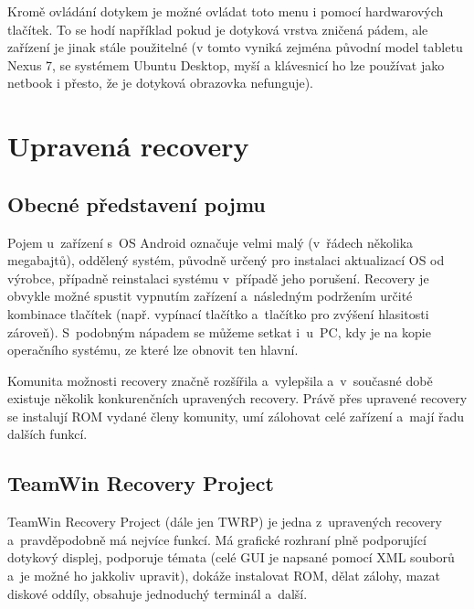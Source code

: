 \documentclass[12pt, a4paper, oneside]{article}
\begin{document}
Kromě ovládání dotykem je možné ovládat toto menu i pomocí hardwarových tlačítek. To se hodí například pokud je dotyková vrstva zničená pádem, ale zařízení je jinak stále použitelné (v tomto vyniká zejména původní model tabletu Nexus 7, se systémem Ubuntu Desktop, myší a klávesnicí ho lze používat jako netbook i přesto, že je dotyková obrazovka nefunguje).

\newpage
\section{Upravená recovery}
\label{recovery}
\subsection{Obecné představení pojmu}
Pojem  u~zařízení s~OS Android označuje velmi malý (v~řádech několika megabajtů), oddělený systém, původně určený pro instalaci aktualizací OS od výrobce, případně reinstalaci systému v~případě jeho porušení. Recovery je obvykle možné spustit vypnutím zařízení a~následným podržením určité kombinace tlačítek (např. vypínací tlačítko a~tlačítko pro zvýšení hlasitosti zároveň). S~podobným nápadem se můžeme setkat i~u~PC, kdy je na  kopie operačního systému, ze které lze obnovit ten hlavní.

Komunita možnosti recovery značně rozšířila a~vylepšila a~v~současné době existuje několik konkurenčních upravených recovery. Právě přes upravené recovery se instalují ROM vydané členy komunity, umí zálohovat celé zařízení a~mají řadu dalších funkcí.

\newpage
\subsection{TeamWin Recovery Project}
TeamWin Recovery Project\cite{twrp} (dále jen TWRP) je jedna z~upravených recovery a~pravděpodobně má nejvíce funkcí. Má grafické rozhraní plně podporující dotykový displej, podporuje témata (celé GUI je napsané pomocí XML souborů a~je možné ho jakkoliv upravit), dokáže instalovat ROM, dělat zálohy, mazat diskové oddíly, obsahuje jednoduchý terminál a~další.
\end{document}
